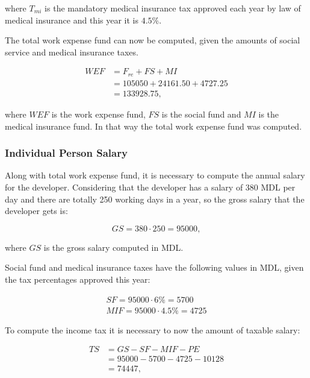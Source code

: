 \noindent where $T_{mi}$ is the mandatory medical insurance tax approved each
year by law of medical insurance and this year it is $4.5\%$.

The total work expense fund can now be computed, given the amounts of social
service and medical insurance taxes.

\begin{equation}
\begin{split}
 WEF &= F_{re} + FS + MI\\
     &= 105050 + 24161.50 + 4727.25\\
     &= 133928.75,
\end{split}
\end{equation}

\noindent where $WEF$ is the work expense fund, $FS$ is the social fund and $MI$
is the medical insurance fund. In that way the total work expense fund was
computed.


\subsubsection{Individual Person Salary}

Along with total work expense fund, it is necessary to compute the annual
salary for the developer. Considering that the developer has a salary of 380
MDL per day and there are totally 250 working days in a year, so the gross
salary that the developer gets is:

\begin{equation}
GS = 380 \cdot 250 = 95000,
\end{equation}

\noindent where $GS$ is the gross salary computed in MDL.

Social fund and medical insurance taxes have the following values in MDL,
given the tax percentages approved this year:

\begin{equation}
\begin{split}
SF = 95000 \cdot 6\% = 5700\\
MIF = 95000 \cdot 4.5\% = 4725
\end{split}
\end{equation}

To compute the income tax it is necessary to now the amount of taxable salary:

\begin{equation}
\begin{split}
 TS &= GS - SF - MIF - PE \\
              &= 95000 - 5700 - 4725 - 10128\\
              &= 74447,
\end{split}
\end{equation}

